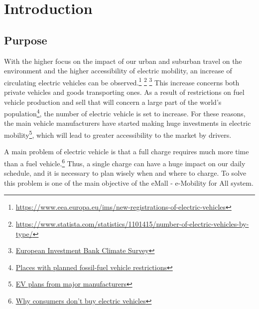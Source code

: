 \section{Introduction}\label{intro}

\subsection{Purpose}
With the higher focus on the impact of our urban and suburban travel on the environment and the higher accessibility of electric mobility, an increase of circulating electric vehicles can be observed.\footnote{\url{https://www.eea.europa.eu/ims/new-registrations-of-electric-vehicles}} \footnote{\url{https://www.statista.com/statistics/1101415/number-of-electric-vehicles-by-type/}} \footnote{\href{https://www.eib.org/en/surveys/climate-survey/4th-climate-survey/hybrid-electric-petrol-cars-flying-holidays-climate.htm}{European Investment Bank Climate Survey}}
This increase concerns both private vehicles and goods transporting ones.
As a result of restrictions on fuel vehicle production and sell that will concern a large part of the world's population\footnote{\href{https://en.wikipedia.org/wiki/Phase-out\_of\_fossil\_fuel\_vehicles\#Places\_with\_planned\_fossil-fuel\_vehicle\_restrictions}{Places with planned fossil-fuel vehicle restrictions}}, the number of
electric vehicle is set to increase. For these reasons, the main vehicle manufacturers have started making huge investments in electric mobility\footnote{\href{https://en.wikipedia.org/wiki/Electric\_car\#EV\_plans\_from\_major\_manufacturers}{EV plans from major manufacturers}}, which will lead to greater accessibility to the market by drivers.
\hfill \break

A main problem of electric vehicle is that a full charge requires much more time than a fuel vehicle.\footnote{\href{https://blinkcharging.com/fact-from-fiction-the-real-reason-why-consumers-dont-buy-electric-vehicles/?locale=en}{Why consumers don't buy electric vehicles}}
Thus, a single charge can have a huge impact on our daily schedule, and it is necessary to plan wisely when and where to charge.
To solve this problem is one of the main objective of the eMall - e-Mobility for All system.
\hfill \break

